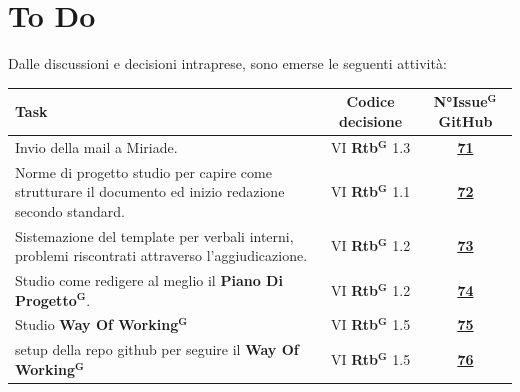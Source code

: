 \documentclass[a4paper,12pt]{article}
\newcommand{\term}[1]{\textbf{#1}$^\mathbf{G}$}
\begin{document}
\section{To Do}
Dalle discussioni e decisioni intraprese, sono emerse le seguenti attività:

\begin{center}
\small
\renewcommand{\arraystretch}{1.2} 
\begin{tabular}{|p{}|c|c|}
\hline
\rowcolor{gray!60} 
\textbf{Task} & \textbf{Codice decisione} & \textbf{N°\term{Issue} GitHub} \\
\hline
\rowcolor{white}
Invio della mail a Miriade. & VI \term{Rtb} 1.3 & \href{https://github.com/SWE-BitByBit/SWE-project/issues/71}{\textbf{71}} \\
\hline
\rowcolor{gray!20}
Norme di progetto studio per capire come strutturare il documento ed inizio redazione secondo standard. & VI \term{Rtb} 1.1 & \href{https://github.com/SWE-BitByBit/SWE-project/issues/72}{\textbf{72}} \\
\hline
\rowcolor{white}
Sistemazione del template per verbali interni, problemi riscontrati attraverso l’aggiudicazione. & VI \term{Rtb} 1.2 & \href{https://github.com/SWE-BitByBit/SWE-project/issues/73}{\textbf{73}} \\
\hline
\rowcolor{gray!20}
Studio come redigere al meglio il \term{Piano Di Progetto}. & VI \term{Rtb} 1.2 & \href{https://github.com/SWE-BitByBit/SWE-project/issues/74}{\textbf{74}} \\
\hline
\rowcolor{white}
Studio \term{Way Of Working} & VI \term{Rtb} 1.5 & \href{https://github.com/SWE-BitByBit/SWE-project/issues/75}{\textbf{75}} \\
\hline
\rowcolor{gray!20}
setup della repo github per seguire il \term{Way Of Working} & VI \term{Rtb} 1.5 & \href{https://github.com/SWE-BitByBit/SWE-project/issues/76}{\textbf{76}} \\
\hline
\end{tabular}
\end{center}
\end{document}

